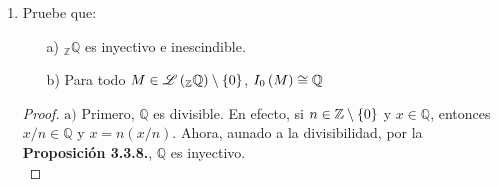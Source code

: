\documentclass{article}
\begin{document}
\begin{enumerate}[label=\textbf{Ej \arabic*.}]
\begin{proof}
			 Supongamos que $Soc\lrprth{M}\neq\gengroup{0}$, entonces $Simp\lrprth{M}\neq\varnothing$ y así sea $N\in\genlin{M}\neq\lrbrack{\gengroup{0}}$ simple. Como  $N\subseteq Soc\lrprth{M}$, pues $Soc\lrprth{M}$ está generado por $\bigcup Simp\lrprth{M}$, entonces si $i_N$ es la inclusión de $N$ en $M$, ${i_N}'$ la de $N$ en $Soc\lrprth{M}$ e $i_{\socle{M}}$ la de $Soc\lrprth{M}$ en $M$, se tiene la siguiente sucesión
			\begin{equation*}
				\shortseq{A=N, B=\socle{M},C=M, AtoB={i_N}', BtoC=i_{\socle{M}},lcr=c,},
			\end{equation*} con $i_N=i_{\socle{M}}{i_N}'$. Por lo anterior, como $i_N$ es un mono-esencial por ser $M$ irreducible y todas las inclusiones antes mencionadas son monomorfismos, aplicando la Proposición 3.3.3 $a)$ se tiene que, en partícular, ${i_N}'$ es un mono-esencial. Así, dado que $\socle{M}$ es semisimple, de la Proposición 3.3.3 $b)$ se tiene que ${i_N}'$ es un isomorfismo. De modo que $\socle{M}=N$ y por lo tanto es simple.\\
			
			 Se tiene que $\socle{M}$ es semisimple, de lo cual se sigue la sucificiencia. Más aún se tiene que $\socle{M}$ es el máximo submódulo semisimple de $M$ (ver la Proposición 3.3.6$a)$), de modo que $M\leq \socle{M}$ si $M$ es semisimple y así se verifica la necesidad. \\
			
			 Se sigue de aplicar el inciso anterior al modulo semisimple $M':=\socle{M}$.\\
		\end{proof}
		
		\item Pruebe que:
		\begin{itemize}
			\item[a)] ${}_{\mathbb{Z}}\mathbb{Q}$ es inyectivo e inescindible.
			\item[b)] Para todo $M\in\mathscr{L}\left({}_{\mathbb{Z}}\mathbb{Q}\right)\setminus\left\{0\right\}$, $I_{0}\left(M\right)\cong\mathbb{Q}$
		\end{itemize}
		\begin{proof}
			$\boxed{\text{a)}}$ Primero, $\mathbb{Q}$ es divisible. En efecto, si $n\in\mathbb{Z}\setminus\left\{0\right\}$ y $x\in\mathbb{Q}$, entonces $x/n\in\mathbb{Q}$ y $x=n(x/n)$. Ahora, aunado a la divisibilidad, por la \textbf{Proposición 3.3.8.}, $\mathbb{Q}$ es inyectivo.\\
			

\end{proof}
\end{enumerate}
\end{document}
